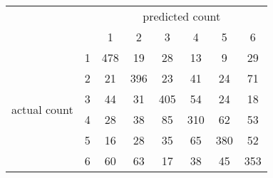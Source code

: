 
\begin{tabular}{*{8}{c}}
& & \multicolumn{6}{c}{predicted count} \\
& & 1 & 2 & 3 & 4 & 5 & 6 \\
\multirow{6}{*}{actual count}
& 1 & 478 & 19 & 28 & 13 & 9 & 29 \\
& 2 & 21 & 396 & 23 & 41 & 24 & 71 \\
& 3 & 44 & 31 & 405 & 54 & 24 & 18 \\
& 4 & 28 & 38 & 85 & 310 & 62 & 53 \\
& 5 & 16 & 28 & 35 & 65 & 380 & 52 \\
& 6 & 60 & 63 & 17 & 38 & 45 & 353 \\
\end{tabular}
